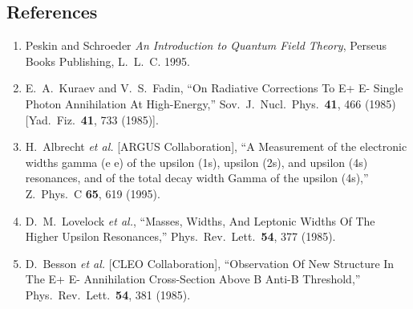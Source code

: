 \documentclass[12pt]{article}
\begin{document}
\subsection{References}

\begin{enumerate}

  \item Peskin and Schroeder {\it An Introduction to Quantum Field
  Theory}, Perseus Books Publishing, L.~L.~C. 1995. \label{cite:ps}

  \item E.~A.~Kuraev and V.~S.~Fadin,
  	``On Radiative Corrections To E+ E- Single Photon Annihilation At High-Energy,''
  	Sov.\ J.\ Nucl.\ Phys.\  {\bf 41}, 466 (1985)
  	[Yad.\ Fiz.\  {\bf 41}, 733 (1985)]. \label{cite:kf}

  \item H.~Albrecht {\it et al.}  [ARGUS Collaboration],
	``A Measurement of the electronic widths gamma (e e) of the upsilon (1s), upsilon (2s),
          and upsilon (4s) resonances, and of the total decay
	width Gamma of the upsilon (4s),''
	Z.\ Phys.\ C {\bf 65}, 619 (1995). \label{cite:argus95}

  \item D.~M.~Lovelock {\it et al.},
	``Masses, Widths, And Leptonic Widths Of The Higher Upsilon Resonances,''
	Phys.\ Rev.\ Lett.\  {\bf 54}, 377 (1985). \label{cite:cleo85}

  \item D.~Besson {\it et al.}  [CLEO Collaboration],
	``Observation Of New Structure In The E+ E- Annihilation Cross-Section Above B Anti-B Threshold,''
	Phys.\ Rev.\ Lett.\  {\bf 54}, 381 (1985). \label{cite:cusb85}

\end{enumerate}
\end{document}
